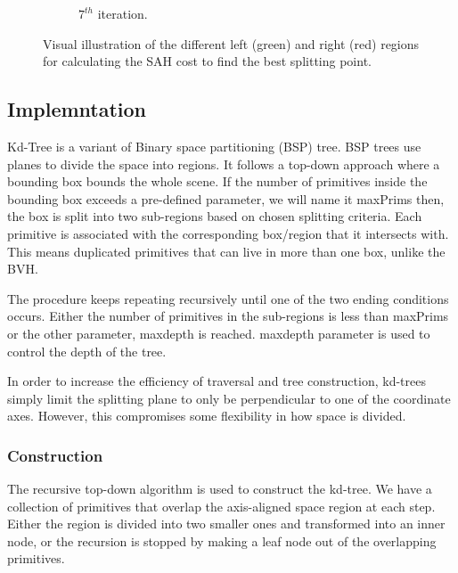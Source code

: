 \documentclass[11pt,a4paper]{article}
\begin{document}
\begin{figure}[H]
\begin{subfigure}[b]{0.475\textwidth}
         \caption{$7^{th} $ iteration.}
         \label{fig:pi_18000}
     \end{subfigure}
        \captionsetup{justification=centering,margin=2cm}
        \caption{Visual illustration of the different left (green) and right (red) regions for calculating the SAH cost to find the best splitting point. }
        \label{fig:three graphs}
\end{figure}



\subsection{Implemntation}

Kd-Tree is a variant of Binary space partitioning (BSP) tree. BSP trees use planes to divide the space into regions. It follows a top-down approach where a bounding box bounds the whole scene. If the number of primitives inside the bounding box exceeds a pre-defined parameter, we will name it maxPrims then, the box is split into two sub-regions based on chosen splitting criteria. Each primitive is associated with the corresponding box/region that it intersects with. This means duplicated primitives that can live in more than one box, unlike the BVH.
\\
\noindent

The procedure keeps repeating recursively until one of the two ending conditions occurs. Either the number of primitives in the sub-regions is less than maxPrims or the other parameter, maxdepth is reached. maxdepth parameter is used to control the depth of the tree. 
\\
\noindent

In order to increase the efficiency of traversal and tree construction, kd-trees simply limit the splitting plane to only be perpendicular to one of the coordinate axes. However, this compromises some flexibility in how space is divided.

\subsubsection{Construction}

The recursive top-down algorithm is used to construct the kd-tree. We have a collection of primitives that overlap the axis-aligned space region at each step. Either the region is divided into two smaller ones and transformed into an inner node, or the recursion is stopped by making a leaf node out of the overlapping primitives.
\\
\noindent
\end{document}
